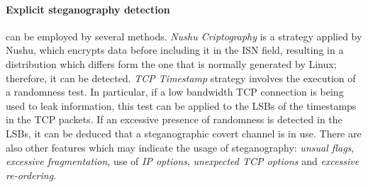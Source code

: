 \documentclass[../../main.tex]{subfiles}
\begin{document}
    \paragraph{Explicit steganography detection} can be employed by several
    methods.
    \emph{Nushu Criptography} is a strategy applied by Nushu, which encrypts
    data before including it in the ISN field, resulting in a distribution which
    differs form the one that is normally generated by Linux; therefore, it can
    be detected. 
    \emph{TCP Timestamp} strategy involves the execution of a randomness test.
    In particular, if a low bandwidth TCP connection is being used to leak
    information, this test can be applied to the LSBs of the timestamps in the
    TCP packets. If an excessive presence of randomness is detected in the LSBs,
    it can be deduced that a steganographic covert channel is in use.
    There are also other features which may indicate the usage of steganography:
    \emph{unsual flags}, \emph{excessive fragmentation}, use of \emph{IP
    options}, \emph{unexpected TCP options} and \emph{excessive re-ordering}.

    \pagebreak
\end{document}
